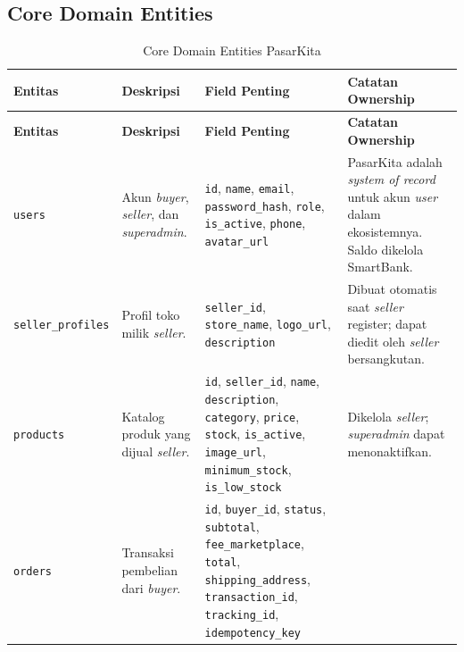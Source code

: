 
\subsection{Core Domain Entities}

\begin{longtable}{|L{2.8cm}|L{3cm}|L{4.7cm}|L{4cm}|}
    \caption{Core Domain Entities PasarKita}
    \label{tab:domain-entities} \\
    \hline
    \textbf{Entitas} & \textbf{Deskripsi} & \textbf{Field Penting}
        & \textbf{Catatan Ownership} \\
    \hline
    \endfirsthead
    \hline
    \textbf{Entitas} & \textbf{Deskripsi} & \textbf{Field Penting}
        & \textbf{Catatan Ownership} \\
    \hline
    \endhead
    \hline
    \endfoot
    \texttt{users}
        & Akun \textit{buyer}, \textit{seller}, dan \textit{superadmin}.
        & \texttt{id}, \texttt{name}, \texttt{email}, \texttt{password\_hash},
          \texttt{role}, \texttt{is\_active}, \texttt{phone}, \texttt{avatar\_url}
        & PasarKita adalah \textit{system of record} untuk akun \textit{user}
          dalam ekosistemnya. Saldo dikelola SmartBank. \\
    \hline
    \texttt{seller\_profiles}
        & Profil toko milik \textit{seller}.
        & \texttt{seller\_id}, \texttt{store\_name}, \texttt{logo\_url},
          \texttt{description}
        & Dibuat otomatis saat \textit{seller} register; dapat diedit oleh
          \textit{seller} bersangkutan. \\
    \hline
    \texttt{products}
        & Katalog produk yang dijual \textit{seller}.
        & \texttt{id}, \texttt{seller\_id}, \texttt{name}, \texttt{description},
          \texttt{category}, \texttt{price}, \texttt{stock}, \texttt{is\_active},
          \texttt{image\_url}, \texttt{minimum\_stock}, \texttt{is\_low\_stock}
        & Dikelola \textit{seller}; \textit{superadmin} dapat menonaktifkan. \\
    \hline
    \texttt{orders}
        & Transaksi pembelian dari \textit{buyer}.
        & \texttt{id}, \texttt{buyer\_id}, \texttt{status}, \texttt{subtotal},
          \texttt{fee\_marketplace}, \texttt{total}, \texttt{shipping\_address},
          \texttt{transaction\_id}, \texttt{tracking\_id}, \texttt{idempotency\_key}

\end{longtable}
